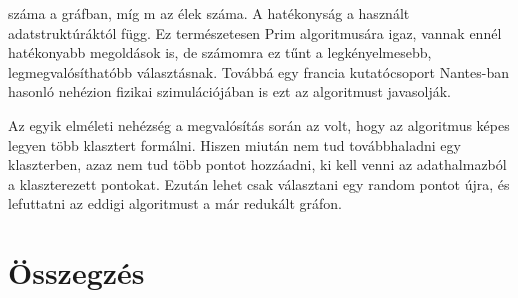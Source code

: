 \documentclass[a4paper,12pt]{article}
\begin{document}
száma a gráfban, míg m az élek száma. A hatékonyság a használt adatstruktúráktól függ. Ez természetesen Prim algoritmusára igaz, vannak ennél hatékonyabb megoldások is, de számomra ez tűnt a legkényelmesebb, legmegvalósíthatóbb választásnak. Továbbá egy francia kutatócsoport Nantes-ban hasonló nehézion fizikai szimulációjában is ezt az algoritmust javasolják.
\par  Az egyik elméleti nehézség a megvalósítás során az volt, hogy az algoritmus képes legyen több klasztert formálni. Hiszen miután nem tud továbbhaladni egy klaszterben, azaz nem tud több pontot hozzáadni, ki kell venni az adathalmazból a klaszterezett pontokat. Ezután lehet csak választani egy random pontot újra, és lefuttatni az eddigi algoritmust a már redukált gráfon.
\section{Összegzés}
\end{document}
